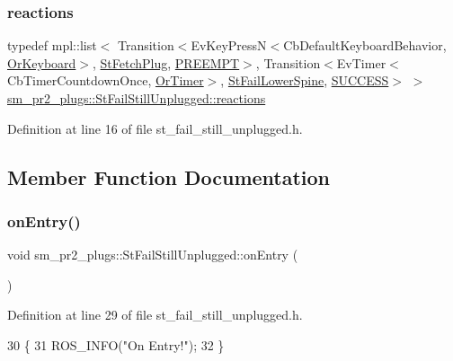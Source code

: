 \subsubsection{\texorpdfstring{reactions}{reactions}}
{\footnotesize\ttfamily typedef mpl\+::list$<$ Transition$<$Ev\+Key\+PressN$<$Cb\+Default\+Keyboard\+Behavior, \hyperlink{classsm__pr2__plugs_1_1OrKeyboard}{Or\+Keyboard}$>$, \hyperlink{structsm__pr2__plugs_1_1StFetchPlug}{St\+Fetch\+Plug}, \hyperlink{classPREEMPT}{P\+R\+E\+E\+M\+PT}$>$, Transition$<$Ev\+Timer$<$Cb\+Timer\+Countdown\+Once, \hyperlink{classsm__pr2__plugs_1_1OrTimer}{Or\+Timer}$>$, \hyperlink{structsm__pr2__plugs_1_1StFailLowerSpine}{St\+Fail\+Lower\+Spine}, \hyperlink{classSUCCESS}{S\+U\+C\+C\+E\+SS}$>$ $>$ \hyperlink{structsm__pr2__plugs_1_1StFailStillUnplugged_a58dc75afc3040293cac801248a1c999c}{sm\+\_\+pr2\+\_\+plugs\+::\+St\+Fail\+Still\+Unplugged\+::reactions}}



Definition at line 16 of file st\+\_\+fail\+\_\+still\+\_\+unplugged.\+h.



\subsection{Member Function Documentation}
\mbox{\label{structsm__pr2__plugs_1_1StFailStillUnplugged_a08767f49952e0dfc3c8b3449ef06beb9}} 
\subsubsection{\texorpdfstring{on\+Entry()}{onEntry()}}
{\footnotesize\ttfamily void sm\+\_\+pr2\+\_\+plugs\+::\+St\+Fail\+Still\+Unplugged\+::on\+Entry (\begin{DoxyParamCaption}{ }\end{DoxyParamCaption})\hspace{0.3cm}{\ttfamily [inline]}}



Definition at line 29 of file st\+\_\+fail\+\_\+still\+\_\+unplugged.\+h.


\begin{DoxyCode}
30     \{
31         ROS\_INFO(\textcolor{stringliteral}{"On Entry!"});
32     \}
\end{DoxyCode}
\mbox{\label{structsm__pr2__plugs_1_1StFailStillUnplugged_afb1c26fa363605535ab36ebf13151718}} 
